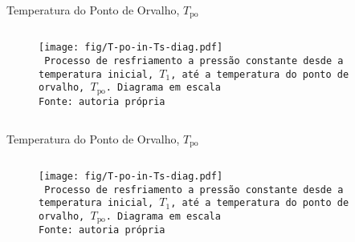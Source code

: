     \begin{frame}{Temperatura do Ponto de Orvalho, $T_{\mathrm{po}}$}\vspace*{-2em}
        \begin{columns}
            \begin{center}
                \begin{figure}
                    \fontsize{5.0}{5}\selectfont
                    \texttt{[image: fig/T-po-in-Ts-diag.pdf]}
                    \\\vspace*{-0.0em}\texttt{%
                        Processo de resfriamento a pressão constante desde a temperatura
                        inicial, $T_1$, até a temperatura do ponto de orvalho,
                        $T_{\mathrm{po}}$. Diagrama em escala \\
                        Fonte: autoria própria
                    }
                \end{figure}
            \end{center}
        \end{columns}
    \end{frame}

    \begin{frame}{Temperatura do Ponto de Orvalho, $T_{\mathrm{po}}$}\vspace*{-2em}
        \begin{columns}
            \begin{center}
                \begin{figure}
                    \fontsize{5.0}{5}\selectfont
                    \texttt{[image: fig/T-po-in-Ts-diag.pdf]}
                    \\\vspace*{-0.0em}\texttt{%
                        Processo de resfriamento a pressão constante desde a temperatura
                        inicial, $T_1$, até a temperatura do ponto de orvalho,
                        $T_{\mathrm{po}}$. Diagrama em escala \\
                        Fonte: autoria própria
                    }
                \end{figure}
            \end{center}
        \end{columns}
    \end{frame}

